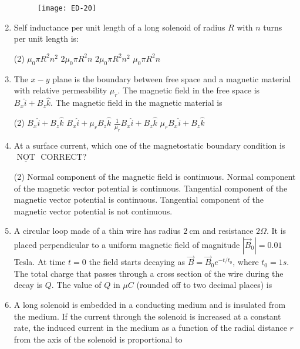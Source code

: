 \begin{enumerate}
		{}
	\begin{figure}[H]
		\centering
		\texttt{[image: ED-20]}
	\end{figure}
\item Self inductance per unit length of a long solenoid of radius $R$ with $n$ turns per unit length is:
	{}
 \begin{tasks}(2)
	\task[\textbf{a.}]$\mu_{0} \pi R^{2} n^{2}$
	\task[\textbf{b.}]$2 \mu_{0} \pi R^{2} n$
	\task[\textbf{c.}]$2 \mu_{0} \pi R^{2} n^{2}$
	\task[\textbf{d.}] $\mu_{0} \pi R^{2} n$
\end{tasks}	
\item The $x-y$ plane is the boundary between free space and a magnetic material with relative permeability $\mu_{r}$. The magnetic field in the free space is $B_{x} \hat{i}+B_{z} \hat{k}$. The magnetic field in the magnetic material is
	{}
 \begin{tasks}(2)
	\task[\textbf{a.}]$B_{x} \hat{i}+B_{z} \hat{k}$
	\task[\textbf{b.}]$B_{x} \hat{i}+\mu_{r} B_{z} \hat{k}$
	\task[\textbf{c.}] $\frac{1}{\mu_{r}} B_{x} \hat{i}+B_{z} \hat{k}$
	\task[\textbf{d.}] $\mu_{r} B_{x} \hat{i}+B_{z} \hat{k}$
\end{tasks}	
\item 	At a surface current, which one of the magnetostatic boundary condition is $\underline{\text { NOT }}$ CORRECT?
{}
	 \begin{tasks}(2)
		\task[\textbf{a.}]Normal component of the magnetic field is continuous.
		\task[\textbf{b.}]Normal component of the magnetic vector potential is continuous.
		\task[\textbf{c.}] Tangential component of the magnetic vector potential is continuous.
		\task[\textbf{d.}] Tangential component of the magnetic vector potential is not continuous.
	\end{tasks}
\item A circular loop made of a thin wire has radius $2 \mathrm{~cm}$ and resistance $2 \Omega$. It is placed perpendicular to a uniform magnetic field of magnitude $\left|\vec{B}_{0}\right|=0.01$ Tesla. At time $t=0$ the field starts decaying as $\vec{B}=\vec{B}_{0} e^{-t / t_{0}}$, where $t_{0}=1 s$. The total charge that passes through a cross section of the wire during the decay is $Q$. The value of $Q$ in $\mu C$ (rounded off to two decimal places) is
{}
\item A long solenoid is embedded in a conducting medium and is insulated from the medium. If the current through the solenoid is increased at a constant rate, the induced current in the medium as a function of the radial distance $r$ from the axis of the solenoid is proportional to

\end{enumerate}
